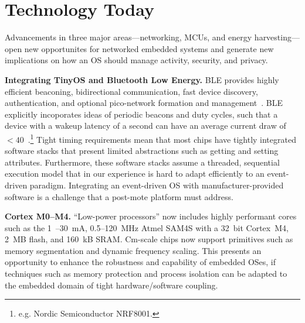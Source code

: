 \section{Technology Today}
Advancements in three major areas---networking, MCUs, and energy
harvesting---open new opportunites for networked embedded systems and generate
new implications on how an OS should manage activity, security, and privacy.


\smallskip\noindent
\textbf{Integrating TinyOS and Bluetooth Low Energy.}
BLE provides highly efficient beaconing,
bidirectional communication, fast device discovery, authentication, and
optional pico-network formation and management~\cite{ble-overview}.
BLE explicitly incoporates ideas of periodic beacons and duty cycles,
such that a device with a wakeup latency of a second can have
an average current draw of $< 40$~\uA.\footnote{
  e.g. Nordic Semiconductor NRF8001.
}
%
Tight timing requirements mean that most chips have tightly
integrated software stacks that present limited abstractions such as
getting and setting attributes. Furthermore, these software stacks
assume a threaded, sequential execution model that in our experience
is hard to adapt efficiently to an event-driven paradigm. Integrating an
event-driven OS with manufacturer-provided software is a
challenge that a post-mote platform must address.


\smallskip\noindent
\textbf{Cortex M0--M4.}
``Low-power processors'' now includes highly performant cores such as the
1~\uA--30~mA, 0.5--120~MHz Atmel SAM4S with a 32~bit Cortex~M4, 2~MB flash,
and 160~kB SRAM.
%
Cm-scale chips now support primitives such as memory segmentation and
dynamic frequency scaling. This presents an opportunity to enhance the
robustness and capability of embedded OSes, if techniques such as memory
protection and process isolation can be adapted to the embedded domain of
tight hardware/software coupling.
%


